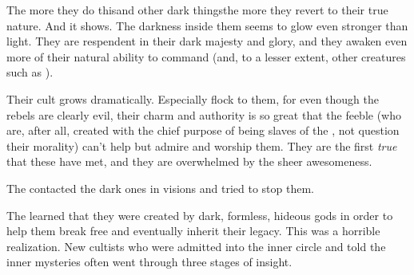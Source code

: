 The more they do this\dash and other dark things\dash the more they revert to their true nature. And it shows. The darkness inside them seems to glow even stronger than light. They are respendent in their dark majesty and glory, and they awaken even more of their natural ability to command \humans{} (and, to a lesser extent, other creatures such as \nephilim). 

Their cult grows dramatically. Especially \humans{} flock to them, for even though the rebels are clearly evil, their charm and authority is so great that the feeble \humans{} (who are, after all, created with the chief purpose of being slaves of the \resphain, not question their morality) can't help but admire and worship them. They are the first \emph{true} \resphain{} that these \humans{} have met, and they are overwhelmed by the sheer awesomeness. 

The  contacted the dark ones in visions and tried to stop them. 


The \resphain learned that they were created by dark, formless, hideous gods in order to help them break free and eventually inherit their legacy.
This was a horrible realization.
New cultists who were admitted into the inner circle and told the inner mysteries often went through three stages of insight. 

